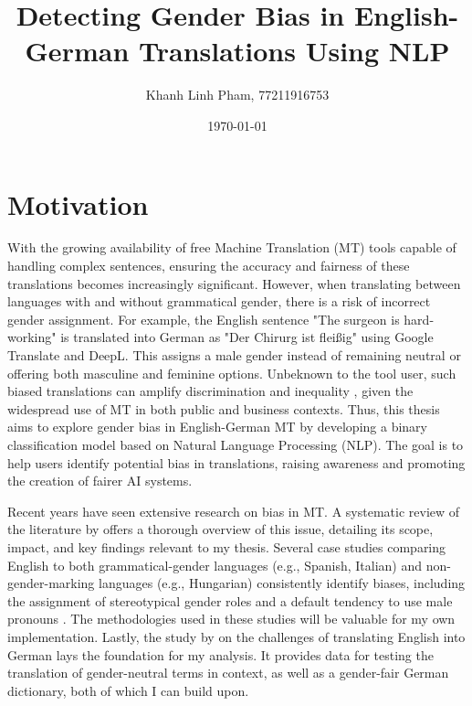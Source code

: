 

\subject{Exposé Bachelor's Thesis}
\title{Detecting Gender Bias in English-German Translations Using NLP}
\author{Khanh Linh Pham, 77211916753}
\date{\today}



\maketitle

\section{Motivation}
With the growing availability of free Machine Translation (MT) tools capable of handling complex sentences, ensuring the accuracy and fairness of these translations becomes increasingly significant. However, when translating between languages with and without grammatical gender, there is a risk of incorrect gender assignment. For example, the English sentence "The surgeon is hard-working" is translated into German as "Der Chirurg ist fleißig" using Google Translate and DeepL. This assigns a male gender instead of remaining neutral or offering both masculine and feminine options. Unbeknown to the tool user, such biased translations can amplify discrimination and inequality \parencite{braccini_does_2024}, given the widespread use of MT in both public and business contexts. Thus, this thesis aims to explore gender bias in English-German MT by developing a binary classification model based on Natural Language Processing (NLP). The goal is to help users identify potential bias in translations, raising awareness and promoting the creation of fairer AI systems.


Recent years have seen extensive research on bias in MT. A systematic review of the literature by \textcite{shrestha_exploring_2022} offers a thorough overview of this issue, detailing its scope, impact, and key findings relevant to my thesis. Several case studies comparing English to both grammatical-gender languages (e.g., Spanish, Italian) and non-gender-marking languages (e.g., Hungarian) consistently identify biases, including the assignment of stereotypical gender roles and a default tendency to use male pronouns \parencite{stanovsky_evaluating_2019, prates_assessing_2019, braccini_does_2024}. The methodologies used in these studies will be valuable for my own implementation. Lastly, the study by \textcite{lardelli_building_2024} on the challenges of translating English into German lays the foundation for my analysis. It provides data for testing the translation of gender-neutral terms in context, as well as a gender-fair German dictionary, both of which I can build upon.


